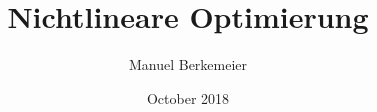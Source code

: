\documentclass[11pt]{report}
\title{Nichtlineare Optimierung}
\author{Manuel Berkemeier}
\date{October 2018}
\begin{document}
\nocite{*}
\maketitle






\end{document}
